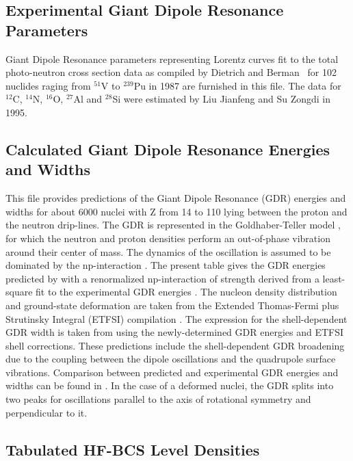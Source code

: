 \subsection{Experimental Giant Dipole Resonance Parameters}

Giant Dipole Resonance parameters representing Lorentz curves fit to the
total photo-neutron cross section data as compiled by Dietrich and Berman~%
\cite{die88} for 102 nuclides raging from $^{51}$V to $^{239}$Pu in
1987 are furnished in this file.
The data for $^{12}$C, $^{14}$N, $^{16}$O, $^{27}$Al and $^{28}$Si were
estimated by Liu Jianfeng and Su Zongdi in 1995.

\subsection{Calculated Giant Dipole Resonance Energies and Widths}

This file provides
predictions of the Giant Dipole Resonance (GDR) energies and widths for
about 6000 nuclei with Z from 14 to 110 lying between the proton
and the neutron drip-lines. The GDR is represented in the Goldhaber-Teller
model \cite{Goldhaber48}, for which the neutron and proton densities perform an
out-of-phase vibration around their center of mass. The dynamics of the
oscillation is assumed to be dominated by the np-interaction \cite{Isacker92}%
. The present table gives the GDR energies predicted by \cite{Isacker92}
with a renormalized np-interaction of strength derived from a least-square
fit to the experimental GDR energies \cite{Goriely98}. The nucleon density
distribution and ground-state deformation are taken from the Extended
Thomas-Fermi plus Strutinsky Integral (ETFSI) compilation \cite%
{Goriely2000,Aboussir95}. The expression for the shell-dependent GDR width
is taken from \cite{Thielemann1983} using the newly-determined GDR energies
and ETFSI shell corrections. These predictions include the
shell-dependent GDR broadening due to the coupling between the dipole
oscillations and the quadrupole surface vibrations. Comparison between
predicted and experimental GDR energies and widths can be found in \cite%
{Goriely98}. In the case of a deformed nuclei,
the GDR splits into two peaks for
oscillations parallel to the axis of rotational symmetry and perpendicular
to it.

\subsection{Tabulated HF-BCS Level Densities}

